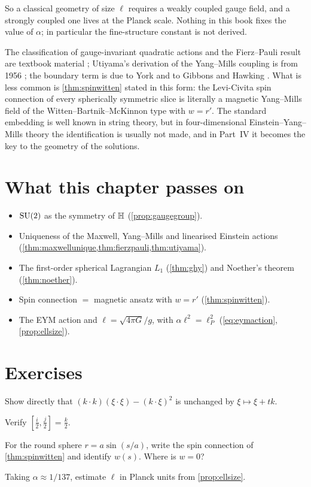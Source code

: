 So a classical geometry of size $\ell$ requires a weakly coupled gauge field, and a strongly coupled one lives at the Planck scale. Nothing in this book fixes the value of $\alpha$; in particular the fine-structure constant is not derived.

\begin{litbox}
The classification of gauge-invariant quadratic actions and the Fierz--Pauli result are textbook material \cite{FierzPauli1939,Weinberg1965}; Utiyama's derivation of the Yang--Mills coupling is from 1956 \cite{Utiyama1956}; the boundary term is due to York and to Gibbons and Hawking \cite{York1972,GibbonsHawking1977}. What is less common is \cref{thm:spinwitten} stated in this form: the Levi-Civita spin connection of every spherically symmetric slice is literally a magnetic Yang--Mills field of the Witten--Bartnik--McKinnon type with $w=r'$. The standard embedding is well known in string theory, but in four-dimensional Einstein--Yang--Mills theory the identification is usually not made, and in Part~IV it becomes the key to the geometry of the solutions.
\end{litbox}

\section*{What this chapter passes on}
\begin{itemize}[nosep]
\item $\mathrm{SU}(2)$ as the symmetry of $\mathbb{H}$ (\cref{prop:gaugegroup}).
\item Uniqueness of the Maxwell, Yang--Mills and linearised Einstein actions (\cref{thm:maxwellunique,thm:fierzpauli,thm:utiyama}).
\item The first-order spherical Lagrangian $L_1$ (\cref{thm:ghy}) and Noether's theorem (\cref{thm:noether}).
\item Spin connection $=$ magnetic ansatz with $w=r'$ (\cref{thm:spinwitten}).
\item The EYM action and $\ell=\sqrt{4\pi G}/g$, with $\alpha\ell^2=\ell_P^2$ (\eqref{eq:eymaction}, \cref{prop:ellsize}).
\end{itemize}

\section*{Exercises}
\begin{exercise}
Show directly that $(k\cdot k)(\xi\cdot\xi)-(k\cdot\xi)^2$ is unchanged by $\xi\mapsto\xi+tk$.
\end{exercise}
\begin{exercise}
Verify $[\frac i2,\frac j2]=\frac k2$.
\end{exercise}
\begin{exercise}
For the round sphere $r=a\sin(s/a)$, write the spin connection of \cref{thm:spinwitten} and identify $w(s)$. Where is $w=0$?
\end{exercise}
\begin{exercise}
Taking $\alpha\approx1/137$, estimate $\ell$ in Planck units from \cref{prop:ellsize}.
\end{exercise}

